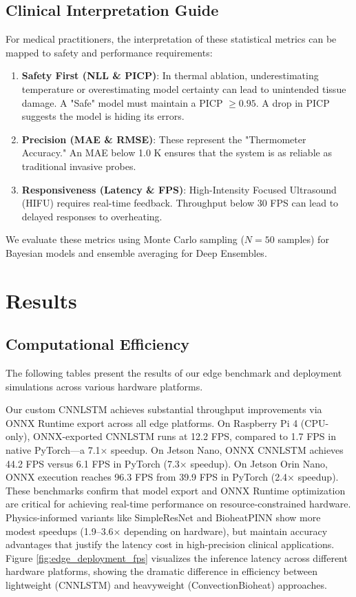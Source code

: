 \documentclass[conference]{IEEEtran}
\begin{document}
\subsection{Clinical Interpretation Guide}
For medical practitioners, the interpretation of these statistical metrics can be mapped to safety and performance requirements:
\begin{enumerate}
    \item \textbf{Safety First (NLL \& PICP)}: In thermal ablation, underestimating temperature or overestimating model certainty can lead to unintended tissue damage. A "Safe" model must maintain a PICP $\ge 0.95$. A drop in PICP suggests the model is hiding its errors.
    \item \textbf{Precision (MAE \& RMSE)}: These represent the "Thermometer Accuracy." An MAE below 1.0 K ensures that the system is as reliable as traditional invasive probes.
    \item \textbf{Responsiveness (Latency \& FPS)}: High-Intensity Focused Ultrasound (HIFU) requires real-time feedback. Throughput below 30 FPS can lead to delayed responses to overheating.
\end{enumerate}

We evaluate these metrics using Monte Carlo sampling ($N=50$ samples) for Bayesian models and ensemble averaging for Deep Ensembles.

\section{Results}\label{sec:results}

\subsection{Computational Efficiency}\label{sec:computational_efficiency}
The following tables present the results of our edge benchmark and deployment simulations across various hardware platforms.



Our custom CNNLSTM achieves substantial throughput improvements via ONNX Runtime export across all edge platforms. On Raspberry Pi 4 (CPU-only), ONNX-exported CNNLSTM runs at 12.2 FPS, compared to 1.7 FPS in native PyTorch—a 7.1× speedup. On Jetson Nano, ONNX CNNLSTM achieves 44.2 FPS versus 6.1 FPS in PyTorch (7.3× speedup). On Jetson Orin Nano, ONNX execution reaches 96.3 FPS from 39.9 FPS in PyTorch (2.4× speedup). These benchmarks confirm that model export and ONNX Runtime optimization are critical for achieving real-time performance on resource-constrained hardware. Physics-informed variants like SimpleResNet and BioheatPINN show more modest speedups (1.9–3.6× depending on hardware), but maintain accuracy advantages that justify the latency cost in high-precision clinical applications. Figure \ref{fig:edge_deployment_fps} visualizes the inference latency across different hardware platforms, showing the dramatic difference in efficiency between lightweight (CNNLSTM) and heavyweight (ConvectionBioheat) approaches.
\end{document}
